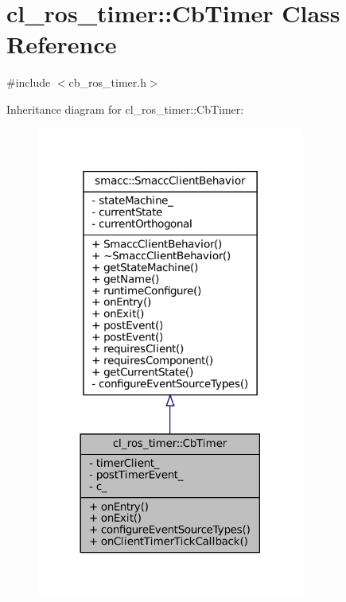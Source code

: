 \hypertarget{classcl__ros__timer_1_1CbTimer}{}\section{cl\+\_\+ros\+\_\+timer\+:\+:Cb\+Timer Class Reference}
\label{classcl__ros__timer_1_1CbTimer}


{\ttfamily \#include $<$cb\+\_\+ros\+\_\+timer.\+h$>$}



Inheritance diagram for cl\+\_\+ros\+\_\+timer\+:\+:Cb\+Timer\+:
\nopagebreak
\begin{figure}[H]
\begin{center}
\leavevmode
\includegraphics[width=249pt]{classcl__ros__timer_1_1CbTimer__inherit__graph}
\end{center}
\end{figure}


